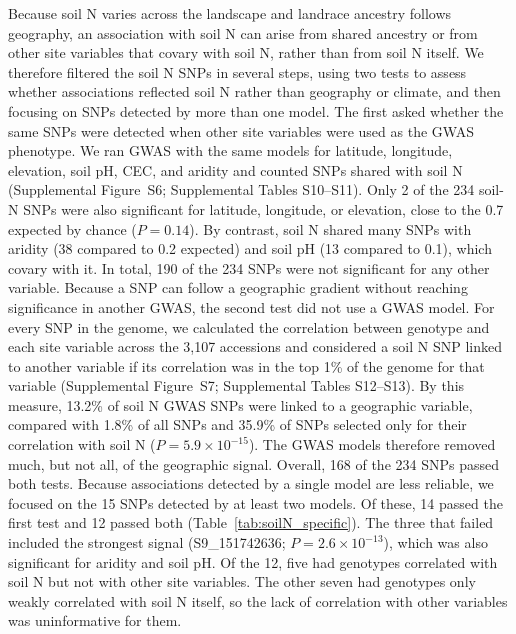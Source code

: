 \documentclass[namedate,unnumsec,webpdf,contemporary,large]{oup-authoring-template}
\begin{document}
Because soil N varies across the landscape and landrace ancestry follows geography, an association with soil N can arise from shared ancestry or from other site variables that covary with soil N, rather than from soil N itself. We therefore filtered the soil N SNPs in several steps, using two tests to assess whether associations reflected soil N rather than geography or climate, and then focusing on SNPs detected by more than one model. The first asked whether the same SNPs were detected when other site variables were used as the GWAS phenotype. We ran GWAS with the same models for latitude, longitude, elevation, soil pH, CEC, and aridity and counted SNPs shared with soil N (Supplemental Figure~S6; Supplemental Tables S10--S11). Only 2 of the 234 soil-N SNPs were also significant for latitude, longitude, or elevation, close to the 0.7 expected by chance ($P = 0.14$). By contrast, soil N shared many SNPs with aridity (38 compared to 0.2 expected) and soil pH (13 compared to 0.1), which covary with it. In total, 190 of the 234 SNPs were not significant for any other variable. Because a SNP can follow a geographic gradient without reaching significance in another GWAS, the second test did not use a GWAS model. For every SNP in the genome, we calculated the correlation between genotype and each site variable across the 3,107 accessions and considered a soil N SNP linked to another variable if its correlation was in the top 1\% of the genome for that variable (Supplemental Figure~S7; Supplemental Tables S12--S13). By this measure, 13.2\% of soil N GWAS SNPs were linked to a geographic variable, compared with 1.8\% of all SNPs and 35.9\% of SNPs selected only for their correlation with soil N ($P = 5.9 \times 10^{-15}$). The GWAS models therefore removed much, but not all, of the geographic signal. Overall, 168 of the 234 SNPs passed both tests. Because associations detected by a single model are less reliable, we focused on the 15 SNPs detected by at least two models. Of these, 14 passed the first test and 12 passed both (Table~\ref{tab:soilN_specific}). The three that failed included the strongest signal (S9\_151742636; $P = 2.6 \times 10^{-13}$), which was also significant for aridity and soil pH. Of the 12, five had genotypes correlated with soil N but not with other site variables. The other seven had genotypes only weakly correlated with soil N itself, so the lack of correlation with other variables was uninformative for them.
\end{document}

